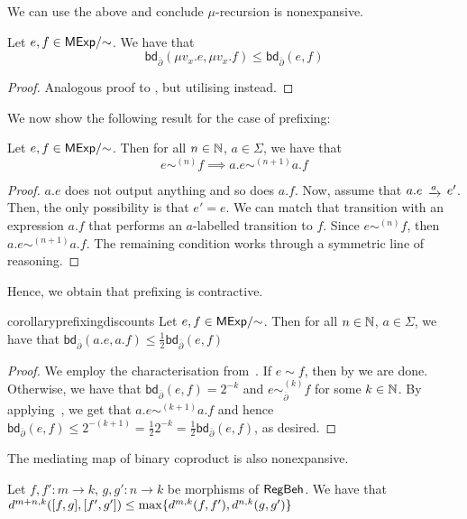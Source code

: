 We can use the above and conclude $\mu$-recursion is nonexpansive.
\begin{corollary}\label{cor:rec_nexp}
	Let $e,f \in {\mathsf{MExp}}/{\sim}$. We have that
	$$
		\mathsf{bd}_{\overline\partial} (\mu v_x.e,\mu v_x.f)\leq \mathsf{bd}_{\overline\partial} (e,f)
	$$
\end{corollary}
\begin{proof}
	Analogous proof to , but utilising  instead.
\end{proof}
We now show the following result for the case of prefixing:
\begin{lemma}\label{lem:prefixing_step}
	Let $e,f \in {\mathsf{MExp}}/{\sim}$. Then for all $n \in \mathbb{N}$, $a \in \Sigma$, we have that
	$$
	e \sim^{(n)} f \implies a.e \sim^{(n+1)} a.f 
	$$
\end{lemma}
\begin{proof}
	$a.e$ does not output anything and so does $a.f$. Now, assume that $a.e \tr{a} e'$. Then, the only possibility is that $e'=e$. We can match that transition with an expression $a.f$ that performs an $a$-labelled transition to $f$. Since $e \sim^{(n)} f$, then $a.e \sim^{(n+1)} a.f$. The remaining condition works through a symmetric line of reasoning. 
\end{proof}
Hence, we obtain that prefixing is contractive.
\begin{restatable}{corollary}{prefixingdiscounts}\label{cor:prefixing_discounts}
	Let $e,f \in {\mathsf{MExp}}/{\sim}$. Then for all $n \in \mathbb{N}$, $a \in \Sigma$, we have that
	$
		\mathsf{bd}_{\overline{\partial}}(a.e,a.f) \leq \frac{1}{2}\mathsf{bd}_{\overline{\partial}}(e,f)
	$
\end{restatable}
\begin{proof}
	We employ the characterisation from~. If $e \sim f$, then by  we are done. Otherwise, we have that $\mathsf{bd}_{\overline\partial}(e,f)=2^{-k}$ and $e \sim^{(k)}_{\overline\partial} f$ for some $k \in \mathbb{N}$. By applying~, we get that $a.e \sim^{(k+1)} a.f$ and hence $\mathsf{bd}_{\overline\partial}(e,f)\leq 2^{-(k+1)} = \frac{1}{2} 2^{-k} = \frac{1}{2}\mathsf{bd}_{\overline\partial}(e,f)$, as desired. 
\end{proof}
The mediating map of binary coproduct is also nonexpansive.
\begin{lemma}\label{lem:pairs_nonexpansive}
	Let $f,f' \colon m \to k$, $g,g' \colon n \to k$ be morphisms of $\mathsf{RegBeh}$. We have that $d^{m +n, k}([ f, g ], [ f', g' ]) \leq \max \{d^{m,k}(f,f'), d^{n,k}(g,g')\}$
\end{lemma}
